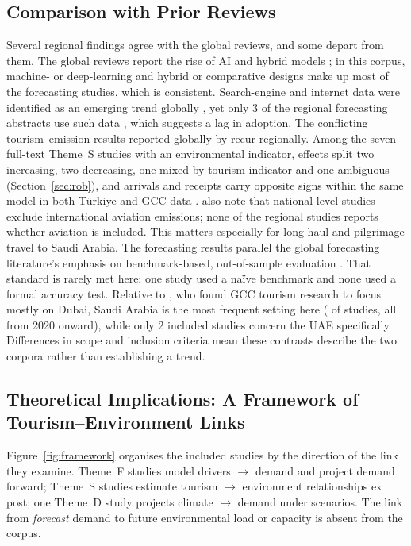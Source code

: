 \documentclass[11pt,a4paper]{article}
\begin{document}
\subsection{Comparison with Prior Reviews}
Several regional findings agree with the global reviews, and some depart from them. The global reviews report the rise of AI and hybrid models \citep{Jiao2019}; in this corpus, \NFm{} machine- or deep-learning and \NFh{} hybrid or comparative designs make up most of the \NnF{} forecasting studies, which is consistent. Search-engine and internet data were identified as an emerging trend globally \citep{Wu2024}, yet only 3 of the \NnF{} regional forecasting abstracts use such data \citep{Rashad2022,Laaroussi2023,Bilek2025}, which suggests a lag in adoption. The conflicting tourism--emission results reported globally by \citet{Sun2022} recur regionally. Among the seven full-text Theme~S studies with an environmental indicator, effects split two increasing, two decreasing, one mixed by tourism indicator and one ambiguous (Section~\ref{sec:rob}), and arrivals and receipts carry opposite signs within the same model in both T\"urkiye \citep{Bahar2023} and GCC data \citep{Farooq2023a}. \citet{Sun2022} also note that national-level studies exclude international aviation emissions; none of the regional studies reports whether aviation is included. This matters especially for long-haul and pilgrimage travel to Saudi Arabia. The forecasting results parallel the global forecasting literature's emphasis on benchmark-based, out-of-sample evaluation \citep{Makridakis2020,Hyndman2021fpp}. That standard is rarely met here: one study used a na\"ive benchmark and none used a formal accuracy test. Relative to \citet{Saleh2021}, who found GCC tourism research to focus mostly on Dubai, Saudi Arabia is the most frequent setting here (\Nsaudiall{} of \Nincluded{} studies, all from 2020 onward), while only 2 included studies concern the UAE specifically. Differences in scope and inclusion criteria mean these contrasts describe the two corpora rather than establishing a trend.

\subsection{Theoretical Implications: A Framework of Tourism--Environment Links}
Figure~\ref{fig:framework} organises the included studies by the direction of the link they examine. Theme~F studies model drivers $\rightarrow$ demand and project demand forward; Theme~S studies estimate tourism $\rightarrow$ environment relationships ex post; one Theme~D study \citep{Chouari2025} projects climate $\rightarrow$ demand under scenarios. The link from \emph{forecast} demand to future environmental load or capacity is absent from the corpus.
\end{document}
